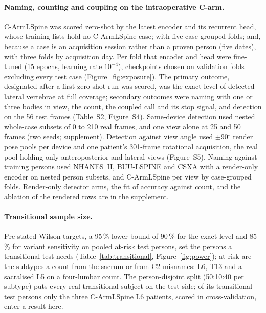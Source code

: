 \paragraph{Naming, counting and coupling on the intraoperative C-arm.}
C-ArmLSpine was scored zero-shot by the latest encoder and its recurrent head, whose training lists hold no
C-ArmLSpine case; with five case-grouped folds; and, because a case is an
acquisition session rather than a proven person (five dates), with three folds by acquisition day. Per
fold that encoder and head were fine-tuned (15 epochs, learning rate $10^{-4}$), checkpoints chosen on validation
folds excluding every test case (Figure~\ref{fig:exposure}). The primary outcome, designated after a first
zero-shot run was scored, was the exact level of detected lateral vertebrae at full coverage; secondary outcomes
were naming with one or three bodies in view, the count, the coupled call and its stop signal, and detection on
the 56 test frames (Table~S2, Figure~S4). Same-device
detection used nested whole-case subsets of 0 to 210 real frames, and one view alone at 25 and 50 frames (two
seeds; supplement). Detection against view angle used $\pm$90$^\circ$ render pose pools per
device and one patient's 301-frame rotational acquisition, the real pool holding only anteroposterior and lateral
views (Figure~S5). Naming against training persons used NHANES~II, BUU-LSPINE and CSXA with a render-only
encoder on nested person subsets, and C-ArmLSpine per view by case-grouped folds. Render-only detector arms, the fit of accuracy against count, and the
ablation of the rendered rows are in the supplement.

\paragraph{Transitional sample size.}
Pre-stated Wilson targets, a 95\,\% lower bound of 90\,\% for the exact level and 85\,\% for variant sensitivity on
pooled at-risk test persons, set the persons a transitional test needs (Table~\ref{tab:transitional},
Figure~\ref{fig:power}); at risk are the subtypes a count from the sacrum or from C2 misnames: L6, T13 and a
sacralised L5 on a four-lumbar count. The person-disjoint split (50:10:40 per subtype) puts every real transitional
subject on the test side; of its transitional test persons only the three C-ArmLSpine L6 patients, scored in
cross-validation, enter a result here.

